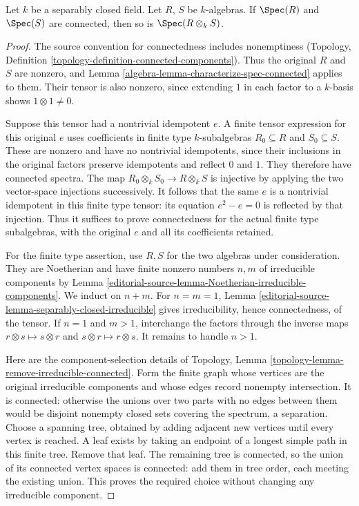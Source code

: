 \begin{lemma}
\label{editorial-source-lemma-separably-closed-connected}
Let $k$ be a separably closed field.
Let $R$, $S$ be $k$-algebras. If $\Spec(R)$ and
$\Spec(S)$ are connected, then so is
$\Spec(R \otimes_k S)$.
\end{lemma}

\begin{proof}
The source convention for connectedness
includes nonemptiness (Topology,
Definition \ref{topology-definition-connected-components}).
Thus the original $R$ and $S$ are
nonzero, and Lemma
\ref{algebra-lemma-characterize-spec-connected}
applies to them. Their tensor is
also nonzero, since extending $1$
in each factor to a $k$-basis
shows $1\otimes1\neq0$.

Suppose this tensor had a nontrivial
idempotent $e$. A finite tensor
expression for this original $e$
uses coefficients in finite type
$k$-subalgebras $R_0\subseteq R$
and $S_0\subseteq S$. These are
nonzero and have no nontrivial
idempotents, since their inclusions
in the original factors preserve
idempotents and reflect $0$ and $1$.
They therefore have connected spectra.
The map $R_0\otimes_k S_0\to R\otimes_k S$
is injective by applying the two
vector-space injections successively.
It follows that the same $e$ is
a nontrivial idempotent in this
finite type tensor: its equation
$e^2-e=0$ is reflected by that
injection. Thus it suffices to
prove connectedness for the actual
finite type subalgebras, with
the original $e$ and all its
coefficients retained.

For the finite type assertion,
use $R,S$ for the two algebras
under consideration. They are
Noetherian and have finite
nonzero numbers $n,m$ of
irreducible components by Lemma
\ref{editorial-source-lemma-Noetherian-irreducible-components}.
We induct on $n+m$. For $n=m=1$,
Lemma \ref{editorial-source-lemma-separably-closed-irreducible}
gives irreducibility, hence
connectedness, of the tensor.
If $n=1$ and $m>1$, interchange
the factors through the inverse
maps $r\otimes s\mapsto s\otimes r$
and $s\otimes r\mapsto r\otimes s$.
It remains to handle $n>1$.

Here are the component-selection
details of Topology, Lemma
\ref{topology-lemma-remove-irreducible-connected}.
Form the finite graph whose
vertices are the original
irreducible components and whose
edges record nonempty intersection.
It is connected: otherwise the
unions over two parts with no
edges between them would be
disjoint nonempty closed sets
covering the spectrum, a separation.
Choose a spanning tree, obtained
by adding adjacent new vertices
until every vertex is reached.
A leaf exists by taking an
endpoint of a longest simple
path in this finite tree.
Remove that leaf. The remaining
tree is connected, so the union
of its connected vertex spaces
is connected: add them in tree
order, each meeting the existing
union. This proves the required
choice without changing any
irreducible component.


\end{proof}
